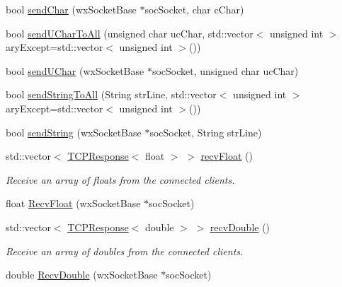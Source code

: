 \begin{DoxyCompactItemize}
\item 
bool \hyperlink{class_rad_jav_1_1_networking_1_1wx_widgets_t_c_p_server_a8a3394fb7cef75e1eb0c452de3be9c45}{send\+Char} (wx\+Socket\+Base $\ast$soc\+Socket, char c\+Char)
\item 
bool \hyperlink{class_rad_jav_1_1_networking_1_1wx_widgets_t_c_p_server_a29c9135333450a8679146ce35ff6a9c3}{send\+U\+Char\+To\+All} (unsigned char uc\+Char, std\+::vector$<$ unsigned int $>$ ary\+Except=std\+::vector$<$ unsigned int $>$())
\item 
bool \hyperlink{class_rad_jav_1_1_networking_1_1wx_widgets_t_c_p_server_a189c9fe762314a50d20125dbee329504}{send\+U\+Char} (wx\+Socket\+Base $\ast$soc\+Socket, unsigned char uc\+Char)
\item 
bool \hyperlink{class_rad_jav_1_1_networking_1_1wx_widgets_t_c_p_server_ab1002ee58f5434e527dbcacb8adeef3b}{send\+String\+To\+All} (String str\+Line, std\+::vector$<$ unsigned int $>$ ary\+Except=std\+::vector$<$ unsigned int $>$())
\item 
bool \hyperlink{class_rad_jav_1_1_networking_1_1wx_widgets_t_c_p_server_ae71cac2428090728ef09e4a61309f3ba}{send\+String} (wx\+Socket\+Base $\ast$soc\+Socket, String str\+Line)
\item 
std\+::vector$<$ \hyperlink{class_rad_jav_1_1_networking_1_1_t_c_p_response}{T\+C\+P\+Response}$<$ float $>$ $>$ \hyperlink{class_rad_jav_1_1_networking_1_1wx_widgets_t_c_p_server_ac4099a0cfaa835a6ddf94f0e8d6c43f8}{recv\+Float} ()
\begin{DoxyCompactList}\small\item\em Receive an array of floats from the connected clients. \end{DoxyCompactList}\item 
float \hyperlink{class_rad_jav_1_1_networking_1_1wx_widgets_t_c_p_server_a75412cc1b9f745e96cbf3715a35f0fcc}{Recv\+Float} (wx\+Socket\+Base $\ast$soc\+Socket)
\item 
std\+::vector$<$ \hyperlink{class_rad_jav_1_1_networking_1_1_t_c_p_response}{T\+C\+P\+Response}$<$ double $>$ $>$ \hyperlink{class_rad_jav_1_1_networking_1_1wx_widgets_t_c_p_server_a30a9e593da5fbbe379d571c9bd3656cf}{recv\+Double} ()
\begin{DoxyCompactList}\small\item\em Receive an array of doubles from the connected clients. \end{DoxyCompactList}\item 
double \hyperlink{class_rad_jav_1_1_networking_1_1wx_widgets_t_c_p_server_a177c4ce79f9690c1ca2c3ee24cf83558}{Recv\+Double} (wx\+Socket\+Base $\ast$soc\+Socket)

\end{DoxyCompactItemize}
